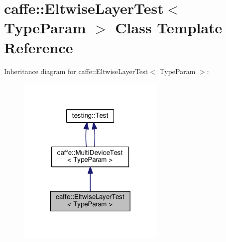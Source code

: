 \hypertarget{classcaffe_1_1_eltwise_layer_test}{}\section{caffe\+:\+:Eltwise\+Layer\+Test$<$ Type\+Param $>$ Class Template Reference}
\label{classcaffe_1_1_eltwise_layer_test}


Inheritance diagram for caffe\+:\+:Eltwise\+Layer\+Test$<$ Type\+Param $>$\+:
\nopagebreak
\begin{figure}[H]
\begin{center}
\leavevmode
\includegraphics[width=200pt]{classcaffe_1_1_eltwise_layer_test__inherit__graph}
\end{center}
\end{figure}
